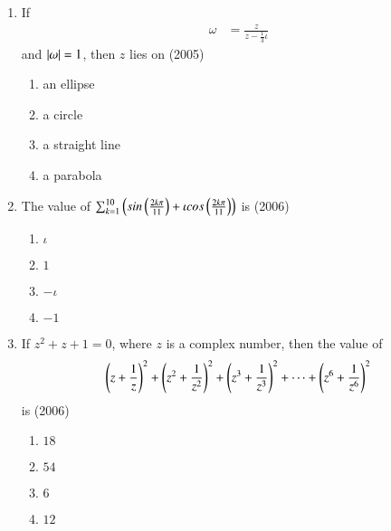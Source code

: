 \documentclass[journal]{IEEEtran}
\begin{document}
\begin{enumerate}
	\item{If \begin{align*} \omega &= \frac{z}{z-\frac{1}{3}\iota} \end{align*} and $\left\vert\omega\right\vert = 1$, then $z$ lies on \hfill (2005)
		\begin{multicols}{4}
		\begin{enumerate}
			\item{an ellipse}
			\columnbreak
			\item{a circle}
			\columnbreak
			\item{a straight line}
			\columnbreak
			\item{a parabola}
		\end{enumerate}
		\end{multicols}}

	\item{The value of $\sum_{k=1}^{10}\left(sin\left(\frac{2k\pi}{11}\right)+\iota cos\left(\frac{2k\pi}{11}\right)\right)$ is 
		\hfill (2006)
		\begin{multicols}{4}
		\begin{enumerate}
			\item{$\iota$}
			\columnbreak
			\item{$1$}
			\columnbreak
			\item{$-\iota$}
			\columnbreak
			\item{$-1$}
		\end{enumerate}
		\end{multicols}}

	\item{If $z^2 + z + 1 = 0$, where $z$ is a complex number, then the value of $$\left(z+\frac{1}{z}\right)^2 + \left(z^2+\frac{1}{z^2}\right)^2 +\left(z^3+ \frac{1}{z^3}\right)^2 + \dots + \left(z^6+\frac{1}{z^6}\right)^2 $$ is \hfill (2006)
		\begin{multicols}{4}
		\begin{enumerate}
			\item{$18$}
			\columnbreak
			\item{$54$}
			\columnbreak
			\item{$6$}
			\columnbreak
			\item{$12$}
		\end{enumerate}
		\end{multicols}}

\end{enumerate}
\end{document}
